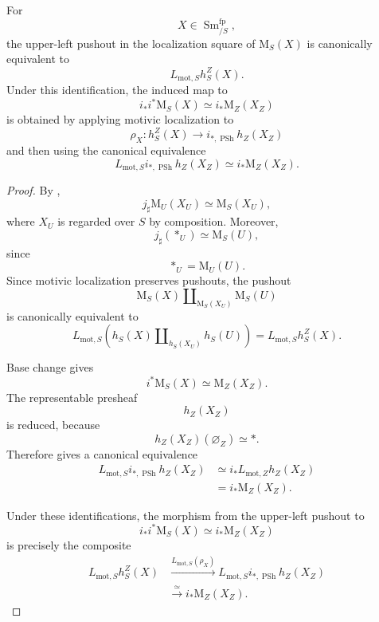 \begin{proposition}
\label{prop:localization-square-smooth-motive}
For
\[
    X
    \in
    \operatorname{Sm}^{\mathrm{fp}}_{/S},
\]
the upper-left pushout in the localization square of
\(\mathrm M_S(X)\) is canonically equivalent to
\[
    L_{\mathrm{mot},S}h_S^Z(X).
\]
Under this identification, the induced map to
\[
    i_*i^*\mathrm M_S(X)
    \simeq
    i_*\mathrm M_Z(X_Z)
\]
is obtained by applying motivic localization to
\[
    \rho_X
    \colon
    h_S^Z(X)
    \longrightarrow
    i_{*,\operatorname{PSh}}h_Z(X_Z)
\]
and then using the canonical equivalence
\[
    L_{\mathrm{mot},S}
    i_{*,\operatorname{PSh}}h_Z(X_Z)
    \simeq
    i_*\mathrm M_Z(X_Z).
\]
\end{proposition}

\begin{proof}
By
,
\[
    j_\sharp\mathrm M_U(X_U)
    \simeq
    \mathrm M_S(X_U),
\]
where \(X_U\) is regarded over \(S\) by composition.  Moreover,
\[
    j_\sharp(*_U)
    \simeq
    \mathrm M_S(U),
\]
since
\[
    *_U
    =
    \mathrm M_U(U).
\]
Since motivic localization preserves pushouts, the pushout
\[
    \mathrm M_S(X)
    \amalg_{\mathrm M_S(X_U)}
    \mathrm M_S(U)
\]
is canonically equivalent to
\[
    L_{\mathrm{mot},S}
    \left(
        h_S(X)
        \amalg_{h_S(X_U)}
        h_S(U)
    \right)
    =
    L_{\mathrm{mot},S}h_S^Z(X).
\]

Base change gives
\[
    i^*\mathrm M_S(X)
    \simeq
    \mathrm M_Z(X_Z).
\]
The representable presheaf
\[
    h_Z(X_Z)
\]
is reduced, because
\[
    h_Z(X_Z)(\varnothing_Z)
    \simeq
    *.
\]
Therefore
gives a canonical equivalence
\[
\begin{aligned}
    L_{\mathrm{mot},S}
    i_{*,\operatorname{PSh}}h_Z(X_Z)
    &\simeq
    i_*L_{\mathrm{mot},Z}h_Z(X_Z)
    \\
    &=
    i_*\mathrm M_Z(X_Z).
\end{aligned}
\]

Under these identifications, the morphism from the upper-left pushout
to
\[
    i_*i^*\mathrm M_S(X)
    \simeq
    i_*\mathrm M_Z(X_Z)
\]
is precisely the composite
\[
\begin{aligned}
    L_{\mathrm{mot},S}h_S^Z(X)
    &\xrightarrow{
        L_{\mathrm{mot},S}(\rho_X)
    }
    L_{\mathrm{mot},S}
    i_{*,\operatorname{PSh}}h_Z(X_Z)
    \\
    &\xrightarrow{\simeq}
    i_*\mathrm M_Z(X_Z).
\end{aligned}
\]
\end{proof}

